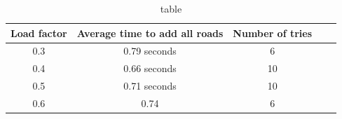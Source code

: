 \documentclass[a4paper,10pt,titlepage]{article}
\begin{document}
\begin{table}
\caption{table}
\centering
\begin{tabular}{c c c c c}
Load factor & Average time to add all roads & Number of tries \\ [0.5ex] 
\hline
0.3 & 0.79 seconds & 6\\
0.4 & 0.66 seconds & 10 \\
0.5 & 0.71 seconds & 10 \\
0.6 & 0.74 & 6



\end{tabular}
\end{table}
\end{document}
